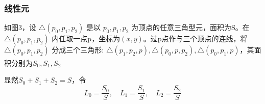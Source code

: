 \documentclass[a4paper,UTF8,titlepage]{ctexart}
\begin{document}

\subsubsection{线性元}

如图3，设 $ \bigtriangleup(p_0,p_1,p_2) $ 是以 $p_0,p_1,p_2$ 为顶点的任意三角型元，面积为S。在 $ \bigtriangleup (p_0,p_1,p_2) $ 内任取一点p，坐标为$(x,y)$。过p点作与三个顶点的连线，将 $ \bigtriangleup(p_0,p_1,p_2) $ 分成三个三角形: $ \bigtriangleup(p_1,p_2,p), \bigtriangleup(p_0,p,p_2), \bigtriangleup(p_0,p_1,p) $，其面积分别为$S_0,S_1,S_2$ \textsuperscript{\cite{李荣华2007偏微分方程数值解}}


\begin{figure}[h]
	\centering
	\caption{}
	\label{1}
\end{figure}

显然$S_0 + S_1 + S_2 = S$，令
$$
L_0 = \frac{S_0}{S}, \quad L_1 = \frac{S_1}{S}, \quad L_2 = \frac{S_2}{S}
$$
\par
\end{document}
